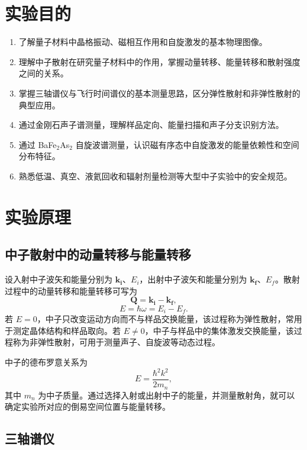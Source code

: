 \documentclass[a4paper]{ctexart}
\begin{document}
\section{实验目的}

\begin{enumerate}
    \item 了解量子材料中晶格振动、磁相互作用和自旋激发的基本物理图像。
    \item 理解中子散射在研究量子材料中的作用，掌握动量转移、能量转移和散射强度之间的关系。
    \item 掌握三轴谱仪与飞行时间谱仪的基本测量思路，区分弹性散射和非弹性散射的典型应用。
    \item 通过金刚石声子谱测量，理解样品定向、能量扫描和声子分支识别方法。
    \item 通过 BaFe$_2$As$_2$ 自旋波谱测量，认识磁有序态中自旋激发的能量依赖性和空间分布特征。
    \item 熟悉低温、真空、液氦回收和辐射剂量检测等大型中子实验中的安全规范。
\end{enumerate}

\section{实验原理}

\subsection{中子散射中的动量转移与能量转移}

设入射中子波矢和能量分别为 $\mathbf{k_i}$、$E_i$，出射中子波矢和能量分别为 $\mathbf{k_f}$、$E_f$。散射过程中的动量转移和能量转移可写为
\begin{equation}
    \mathbf{Q}=\mathbf{k_i}-\mathbf{k_f},
\end{equation}
\begin{equation}
    E=\hbar\omega=E_i-E_f .
\end{equation}
若 $E=0$，中子只改变运动方向而不与样品交换能量，该过程称为弹性散射，常用于测定晶体结构和样品取向。若 $E\neq0$，中子与样品中的集体激发交换能量，该过程称为非弹性散射，可用于测量声子、自旋波等动态过程。

中子的德布罗意关系为
\begin{equation}
    E=\frac{\hbar^2 k^2}{2m_n},
\end{equation}
其中 $m_n$ 为中子质量。通过选择入射或出射中子的能量，并测量散射角，就可以确定实验所对应的倒易空间位置与能量转移。

\subsection{三轴谱仪}
\end{document}
